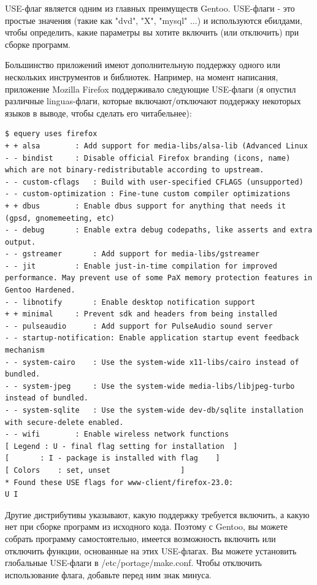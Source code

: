 \documentclass[10pt]{book}
\begin{document}
USE-флаг является одним из главных преимуществ Gentoo. USE-флаги - это простые значения (такие как "dvd", "X", "mysql" ...) и используются ебилдами, чтобы определить, какие параметры вы хотите включить (или отключить) при сборке программ.

Большинство приложений имеют дополнительную поддержку одного или нескольких инструментов и библиотек. Например, на момент написания, приложение Mozilla Firefox поддерживало следующие USE-флаги (я опустил различные linguas-флаги, которые включают/отключают поддержку некоторых языков в выводе, чтобы сделать его читабельнее):

\begin{tcolorbox}
\begin{lstlisting}
$ equery uses firefox
+ + alsa		: Add support for media-libs/alsa-lib (Advanced Linux
- - bindist		: Disable official Firefox branding (icons, name) which are not binary-redistributable according to upstream.
- - custom-cflags	: Build with user-specified CFLAGS (unsupported)
- - custom-optimization : Fine-tune custom compiler optimizations 
+ + dbus 		: Enable dbus support for anything that needs it (gpsd, gnomemeeting, etc) 
- - debug	 	: Enable extra debug codepaths, like asserts and extra output.
- - gstreamer		: Add support for media-libs/gstreamer 
- - jit			: Enable just-in-time compilation for improved performance. May prevent use of some PaX memory protection features in Gentoo Hardened. 
- - libnotify		: Enable desktop notification support
+ + minimal		: Prevent sdk and headers from being installed
- - pulseaudio		: Add support for PulseAudio sound server
- - startup-notification: Enable application startup event feedback mechanism
- - system-cairo	: Use the system-wide x11-libs/cairo instead of bundled.
- - system-jpeg		: Use the system-wide media-libs/libjpeg-turbo instead of bundled.
- - system-sqlite	: Use the system-wide dev-db/sqlite installation with secure-delete enabled.
- - wifi		: Enable wireless network functions
[ Legend : U - final flag setting for installation	]
[		: I - package is installed with flag	]
[ Colors 	: set, unset   				]
* Found these USE flags for www-client/firefox-23.0:
U I
\end{lstlisting}
\end{tcolorbox}

Другие дистрибутивы указывают, какую поддержку требуется включить, а какую нет при сборке программ из исходного кода. Поэтому с Gentoo, вы можете собрать программу самостоятельно, имеется возможность включить или отключить функции, основанные на этих USE-флагах.
Вы можете установить глобальные USE-флаги в  /etc/portage/make.conf. Чтобы отключить использование флага, добавьте перед ним знак минуса.
\end{document}

